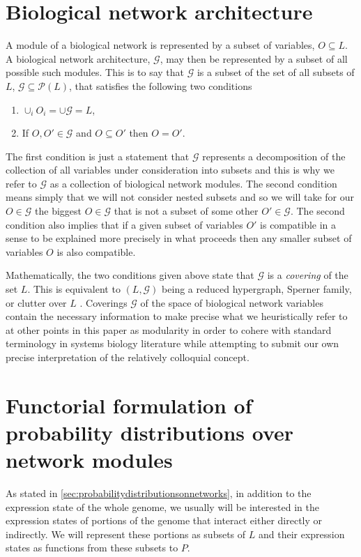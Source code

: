 \section{Biological network architecture}\label{sec:covergenotypespace}
A module of a biological network is represented by a subset of variables, $O \subseteq L$. A biological network architecture, $\mathcal{G}$, may then be represented by a subset of all possible such modules. This is to say that $\mathcal{G}$ is a subset of the set of all subsets of $L$, $\mathcal{G} \subseteq \mathcal{P}(L)$, that satisfies the following two conditions
\begin{enumerate}
\item $\cup_i O_i = \cup \mathcal{G} = L$,
\item If $O,O' \in \mathcal{G}$ and $O \subseteq O'$ then $O = O'$.
\end{enumerate}
The first condition is just a statement that $\mathcal{G}$ represents a decomposition of the collection of all variables under consideration into subsets and this is why we refer to $\mathcal{G}$ as a collection of biological network modules. The second condition means simply that we will not consider nested subsets and so we will take for our $O \in \mathcal{G}$ the biggest $O \in \mathcal{G}$ that is not a subset of some other $O' \in \mathcal{G}$. The second condition also implies that if a given subset of variables $O'$ is compatible in a sense to be explained more precisely in what proceeds then any smaller subset of variables $O$ is also compatible.

Mathematically, the two conditions given above state that $\mathcal{G}$ is a \emph{covering} of the set $L$.  This is equivalent to $(L, \mathcal{G})$ being a reduced hypergraph, Sperner family, or clutter over $L$ \cite{Lauritzen1996}.  Coverings $\mathcal{G}$ of the space of biological network variables contain the necessary information to make precise what we heuristically refer to at other points in this paper as modularity in order to cohere with standard terminology in systems biology literature while attempting to submit our own precise interpretation of the relatively colloquial concept.

\section{Functorial formulation of probability distributions over network modules}\label{secsupp:probabilitydistributionsonnetworks}

As stated in \autoref{sec:probabilitydistributionsonnetworks}, in addition to the expression state of the whole genome, we usually will be interested in the expression states of portions of the genome that interact either directly or indirectly.  We will represent these portions as subsets of $L$ and their expression states as functions from these subsets to $P$.

